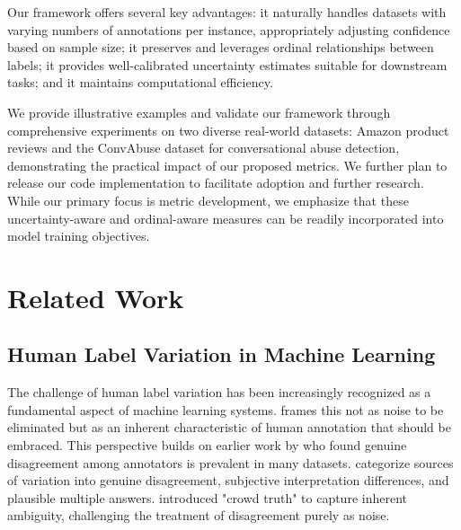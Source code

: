 \documentclass[journal]{IEEEtran}
\begin{document}
Our framework offers several key advantages: it naturally handles datasets with varying numbers of annotations per instance, appropriately adjusting confidence based on sample size; it preserves and leverages ordinal relationships between labels; it provides well-calibrated uncertainty estimates suitable for downstream tasks; and it maintains computational efficiency.

We provide illustrative examples and validate our framework through comprehensive experiments on two diverse real-world datasets: Amazon product reviews and the ConvAbuse dataset for conversational abuse detection, demonstrating the practical impact of our proposed metrics. We further plan to release our code implementation to facilitate adoption and further research. While our primary focus is metric development, we emphasize that these uncertainty-aware and ordinal-aware measures can be readily incorporated into model training objectives.

\section{Related Work}
\subsection{Human Label Variation in Machine Learning}
The challenge of human label variation has been increasingly recognized as a fundamental aspect of machine learning systems. \cite{plank2022} frames this not as noise to be eliminated but as an inherent characteristic of human annotation that should be embraced. This perspective builds on earlier work by \cite{pavlick2019} who found genuine disagreement among annotators is prevalent in many datasets. \cite{uma2021b} categorize sources of variation into genuine disagreement, subjective interpretation differences, and plausible multiple answers. \cite{aroyo2015} introduced "crowd truth" to capture inherent ambiguity, challenging the treatment of disagreement purely as noise.
\end{document}
